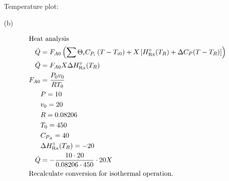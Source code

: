Temperature plot:

\begin{center}
    
\end{center}

(b)

\begin{align*}
    \intertext{Heat analysis}
    \dot Q &= F_{A0} \left(\sum\Theta_iC_{P_i}\left(T - T_{i0}\right) + X \left[H_{\text{Rx}}^\circ(T_R) + \Delta C_P (T - T_R)\right]\right) \\
    \dot Q &= F_{A0} X \Delta H_{\text{Rx}}^\circ(T_R) \\
    F_{A0} &= \frac{P_0 v_0}{R T_0} \\
    & P = 10 \\
    & v_0 = 20 \\
    & R = 0.08206 \\ 
    & T_0 = 450 \\
    & C_{P_A} = 40 \\
    & \Delta H_{\text{Rx}}^\circ(T_R) = -20 \\
    \dot Q &= - \frac{10 \cdot 20}{0.08206 \cdot 450} \cdot 20 X \\
    \intertext{Recalculate conversion for isothermal operation.}
\end{align*}

\begin{center}
    
\end{center}